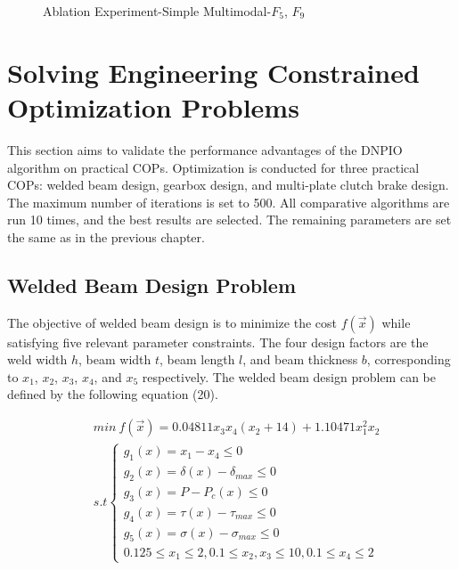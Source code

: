 \documentclass[preprint,review,compress,12pt]{elsarticle}
\begin{document}
\begin{figure}[H]
\centering
{}
\quad
{}
\caption{Ablation Experiment-Simple Multimodal-$F_5$, $F_9$}
\end{figure}

\section{Solving Engineering Constrained Optimization Problems}

This section aims to validate the performance advantages of the DNPIO algorithm on practical COPs. Optimization is conducted for three practical COPs: welded beam design, gearbox design, and multi-plate clutch brake design. The maximum number of iterations is set to 500. All comparative algorithms are run 10 times, and the best results are selected. The remaining parameters are set the same as in the previous chapter.

\subsection{Welded Beam Design Problem}

The objective of welded beam design is to minimize the cost $f(\vec{x})$ while satisfying five relevant parameter constraints. The four design factors are the weld width $h$, beam width $t$, beam length $l$, and beam thickness $b$, corresponding to $x_1$, $x_2$, $x_3$, $x_4$, and $x_5$ respectively. The welded beam design problem can be defined by the following equation (20).



\begin{equation} 
\begin{split}  
&min\ f(\vec{x}) = 0.04811x_3x_4(x_2+14)+1.10471x^2_1x_2   \\&s.t\left\{\begin{matrix} g_1(x) = x_1-x_4\le 0 \\ g_2(x) = \delta (x)-\delta _{max}\le 0 \\ g_3(x) = P-P_c(x)\le 0 \\ g_4(x) = \tau (x)-\tau _{max}\le 0 \\ g_5(x) = \sigma (x)-\sigma _{max}\le 0 \\0.125 \le x_1\le 2, 0.1 \le x_2,x_3\le 10,0.1 \le x_4 \le 2\end{matrix}\right.  \end{split}  
\end{equation}
\end{document}
